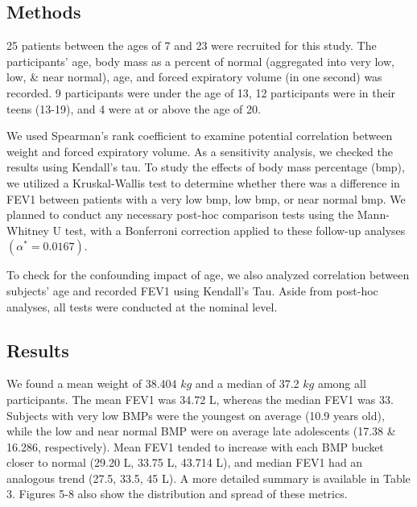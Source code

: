 \documentclass{article}
\begin{document}
		\subsection*{Methods}
		25 patients between the ages of 7 and 23 were recruited for this study. The participants’ age, body mass as a percent of normal (aggregated into very low, low, \& near normal), age, and forced expiratory volume (in one second) was recorded. 9 participants were under the age of 13, 12 participants were in their teens (13-19), and 4 were at or above the age of 20. 

		We used Spearman’s rank coefficient to examine potential correlation between weight and forced expiratory volume. As a sensitivity analysis, we checked the results using Kendall’s tau. To study the effects of body mass percentage (bmp), we utilized a Kruskal-Wallis test to determine whether there was a difference in FEV1 between patients with a very low bmp, low bmp, or near normal bmp. We planned to conduct any necessary post-hoc comparison tests using the Mann-Whitney U test, with a Bonferroni correction applied to these follow-up analyses $(\alpha^* = 0.0167)$. 

		To check for the confounding impact of age, we also analyzed correlation between subjects’ age and recorded FEV1 using Kendall’s Tau. Aside from post-hoc analyses, all tests were conducted at the nominal level.


		\subsection*{Results}
		We found a mean weight of 38.404 $kg$ and a median of 37.2 $kg$ among all participants. The mean FEV1 was 34.72 L, whereas the median FEV1 was 33. Subjects with very low BMPs were the youngest on average (10.9 years old), while the low and near normal BMP were on average late adolescents (17.38 \& 16.286, respectively). Mean FEV1 tended to increase with each BMP bucket closer to normal (29.20 L, 33.75 L, 43.714 L), and median FEV1 had an analogous trend (27.5, 33.5, 45 L). A more detailed summary is available in Table 3. Figures 5-8 also show the distribution and spread of these metrics.
\end{document}
